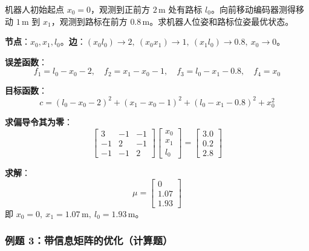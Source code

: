 \documentclass[11pt,a4paper]{article}
\begin{document}
\begin{example}
机器人初始起点 $x_0=0$，观测到正前方 $2\,\mathrm{m}$ 处有路标 $l_0$。向前移动编码器测得移动 $1\,\mathrm{m}$ 到 $x_1$，观测到路标在前方 $0.8\,\mathrm{m}$。求机器人位姿和路标位姿最优状态。

\textbf{节点}：$x_0,x_1,l_0$。\quad \textbf{边}：$(x_0l_0)\to 2,\ (x_0x_1)\to 1,\ (x_1l_0)\to 0.8,\ x_0\to 0$。

\textbf{误差函数}：
\[
f_1=l_0-x_0-2,\quad f_2=x_1-x_0-1,\quad f_3=l_0-x_1-0.8,\quad f_4=x_0
\]

\textbf{目标函数}：
\[
c=(l_0-x_0-2)^2+(x_1-x_0-1)^2+(l_0-x_1-0.8)^2+x_0^2
\]

\textbf{求偏导令其为零}：
\[
\begin{bmatrix}3 & -1 & -1\\ -1 & 2 & -1\\ -1 & -1 & 2\end{bmatrix}
\begin{bmatrix}x_0\\ x_1\\ l_0\end{bmatrix}
=
\begin{bmatrix}3.0\\ 0.2\\ 2.8\end{bmatrix}
\]

\textbf{求解}：
\[
\mu=\begin{bmatrix}0\\ 1.07\\ 1.93\end{bmatrix}
\]
即 $x_0=0,\ x_1=1.07\,\mathrm{m},\ l_0=1.93\,\mathrm{m}$。
\end{example}

\subsubsection*{例题 3：带信息矩阵的优化（计算题）}
\end{document}
